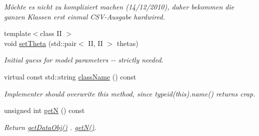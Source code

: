 \begin{DoxyCompactItemize}
\begin{DoxyCompactList}\small\item\em Möchte es nicht zu kompliziert machen (14/12/2010), daher bekommen die ganzen Klassen erst einmal CSV-\/Ausgabe hardwired. \item\end{DoxyCompactList}\item 
{\footnotesize template$<$class II $>$ }\\void \hyperlink{classCDA_1_1EM_ae71052b178877852d34c3aa17e85f8ef}{setTheta} (std::pair$<$ II, II $>$ thetas)
\begin{DoxyCompactList}\small\item\em Initial guess for model parameters -\/-\/ strictly needed. \item\end{DoxyCompactList}\item 
\hypertarget{classCDA_1_1EM_aa3edb551271b47675c817fa6c302741d}{
virtual const std::string \hyperlink{classCDA_1_1EM_aa3edb551271b47675c817fa6c302741d}{className} () const }
\label{classCDA_1_1EM_aa3edb551271b47675c817fa6c302741d}

\begin{DoxyCompactList}\small\item\em Implementer should overwrite this method, since typeid(this).name() returns crap. \item\end{DoxyCompactList}\item 
unsigned int \hyperlink{classCDA_1_1EM_a12d59d14b42f67805dbf2f721323e318}{getN} () const 
\begin{DoxyCompactList}\small\item\em Return \hyperlink{classCDA_1_1EM_a15809e2026eaea4c68b2e3e11c807fff}{getDataObj()} . \hyperlink{classCDA_1_1EM_a12d59d14b42f67805dbf2f721323e318}{getN()}. \item\end{DoxyCompactList}\end{DoxyCompactItemize}
